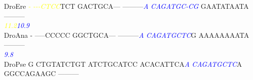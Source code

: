 \documentclass[11pt,twoside,reqno,a4paper]{article}
\begin{document}
{DroEre	\textit{\textcolor{Yellow}{-}}	\textit{\textcolor{Yellow}{-}}\textit{\textcolor{Yellow}{-}}\textit{\textcolor{Yellow}{-}}\textit{\textcolor{Yellow}{C}}\textit{\textcolor{Yellow}{T}}\textit{\textcolor{Yellow}{C}}\textit{\textcolor{Yellow}{C}}TCT	GACTGCA---	---------\textit{\textcolor{Blue}{A}}	\textit{\textcolor{Blue}{C}}\textit{\textcolor{Blue}{A}}\textit{\textcolor{Blue}{G}}\textit{\textcolor{Blue}{A}}\textit{\textcolor{Blue}{T}}\textit{\textcolor{Blue}{G}}\textit{\textcolor{Blue}{C}}\textit{\textcolor{Blue}{-}}\textit{\textcolor{Blue}{C}}\textit{\textcolor{Blue}{G}}	GAATATAATA	---------\\
\hspace*{7\charwidth}\hspace*{0\charwidth}\textit{\textcolor{Yellow}{11.2}}\hspace*{1\charwidth}\hspace*{1\charwidth}\hspace*{1\charwidth}\hspace*{26\charwidth}\textit{\textcolor{Blue}{10.9}}\hspace*{1\charwidth}\hspace*{1\charwidth}\hspace*{1\charwidth}\\
DroAna	-	-----CCCCC	GGCTGCA---	---------\textit{\textcolor{Blue}{A}}	\textit{\textcolor{Blue}{C}}\textit{\textcolor{Blue}{A}}\textit{\textcolor{Blue}{G}}\textit{\textcolor{Blue}{A}}\textit{\textcolor{Blue}{T}}\textit{\textcolor{Blue}{G}}\textit{\textcolor{Blue}{C}}\textit{\textcolor{Blue}{T}}\textit{\textcolor{Blue}{C}}G	AAAAAAAATA	---------\\
\hspace*{7\charwidth}\hspace*{1\charwidth}\hspace*{1\charwidth}\hspace*{1\charwidth}\hspace*{30\charwidth}\textit{\textcolor{Blue}{9.8}}\hspace*{1\charwidth}\hspace*{1\charwidth}\hspace*{1\charwidth}\\
DroPse	G	CTGTATCTGT	ATCTGCATCC	ACACATTCA\textit{\textcolor{Blue}{A}}	\textit{\textcolor{Blue}{C}}\textit{\textcolor{Blue}{A}}\textit{\textcolor{Blue}{G}}\textit{\textcolor{Blue}{A}}\textit{\textcolor{Blue}{T}}\textit{\textcolor{Blue}{G}}\textit{\textcolor{Blue}{C}}\textit{\textcolor{Blue}{T}}\textit{\textcolor{Blue}{C}}A	GGCCAGAAGC	---------\\
}
\end{document}
